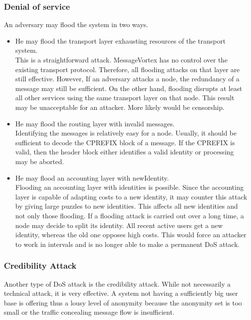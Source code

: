 \subsubsection{Denial of service}
An adversary may flood the system in two ways.
\begin{itemize}
	\item He may flood the transport layer exhausting resources of the transport system.\\
	This is a straightforward attack. MessageVortex has no control over the existing transport protocol. Therefore, all flooding attacks on that layer are still effective. However, If an adversary attacks a node, the redundancy of a message may still be sufficient. On the other hand, flooding disrupts at least all other services using the same transport layer on that node. This result may be unacceptable for an attacker. More likely would be censorship.
	\item He may flood the routing layer with invalid messages.\\ 
	Identifying the messages is relatively easy for a node. Usually, it should be sufficient to decode the CPREFIX block of a message. If the CPREFIX is valid, then the header block either identifies a valid identity or processing may be aborted. 
	\item He may flood an accounting layer with newIdentity.\\
	Flooding an accounting layer with identities is possible. Since the accounting layer is capable of adapting costs to a new identity, it may counter this attack by giving large puzzles to new identities. This affects all new identities and not only those flooding. If a flooding attack is carried out over a long time, a node may decide to split its identity. All recent active users get a new identity, whereas the old one opposes high costs. This would force an attacker to work in intervals and is no longer able to make a permanent DoS attack.
\end{itemize}

\subsubsection{Credibility Attack}
Another type of DoS attack is the credibility attack. While not necessarily a technical attack, it is very effective. A system not having a sufficiently big user base is offering thus a lousy level of anonymity because the anonymity set is too small or the traffic concealing message flow is insufficient. 

